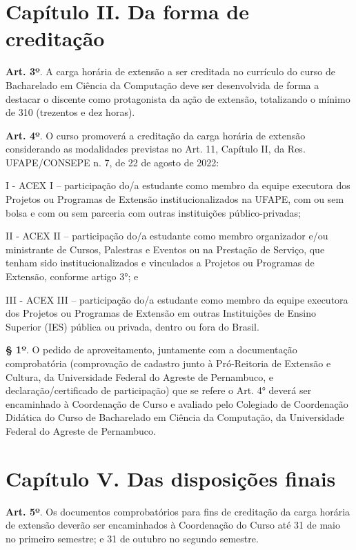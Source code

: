\documentclass[
	12pt,				%
	openright,			%
  oneside,     %
	a4paper,			%
	english,			%
	french,				%
	spanish,			%
	brazil				%
	]{abntex2}
\begin{document}
\begin{anexosenv}
\section*{Capítulo II. Da forma de creditação}

\noindent \textbf{Art. 3º}. A carga horária de extensão a ser creditada no currículo do curso de Bacharelado em Ciência da Computação deve ser desenvolvida de forma a destacar o discente como protagonista da ação de extensão, totalizando o mínimo de 310 (trezentos e dez horas).

\noindent \textbf{Art. 4º}. O curso promoverá a creditação da carga horária de extensão considerando as modalidades previstas no Art. 11, Capítulo II, da Res. UFAPE/CONSEPE n. 7, de 22 de agosto de 2022:

\noindent I - ACEX I – participação do/a estudante como membro da equipe executora dos Projetos ou Programas de Extensão institucionalizados na UFAPE, com ou sem bolsa e com ou sem parceria com outras instituições público-privadas;

\noindent II - ACEX II – participação do/a estudante como membro organizador e/ou ministrante de Cursos, Palestras e Eventos ou na Prestação de Serviço, que tenham sido institucionalizados e vinculados a Projetos ou Programas de Extensão, conforme artigo 3°; e

\noindent III - ACEX III – participação do/a estudante como membro da equipe executora dos Projetos ou Programas de Extensão em outras Instituições de Ensino Superior (IES) pública ou privada, dentro ou fora do Brasil. 

\noindent \textbf{§ 1º}. O pedido de aproveitamento, juntamente com a documentação comprobatória (comprovação de cadastro junto à Pró-Reitoria de Extensão e Cultura, da Universidade Federal do Agreste de Pernambuco, e declaração/certificado de participação) que se refere o Art. 4° deverá ser encaminhado à Coordenação de Curso e avaliado pelo Colegiado de Coordenação Didática do Curso de Bacharelado em Ciência da Computação, da Universidade Federal do Agreste de Pernambuco.

\section*{Capítulo V. Das disposições finais}

\noindent \textbf{Art. 5º}. Os documentos comprobatórios para fins de creditação da carga horária de extensão deverão ser encaminhados à Coordenação do Curso até 31 de maio no primeiro semestre; e 31 de outubro no segundo semestre.


\end{anexosenv}
\end{document}
